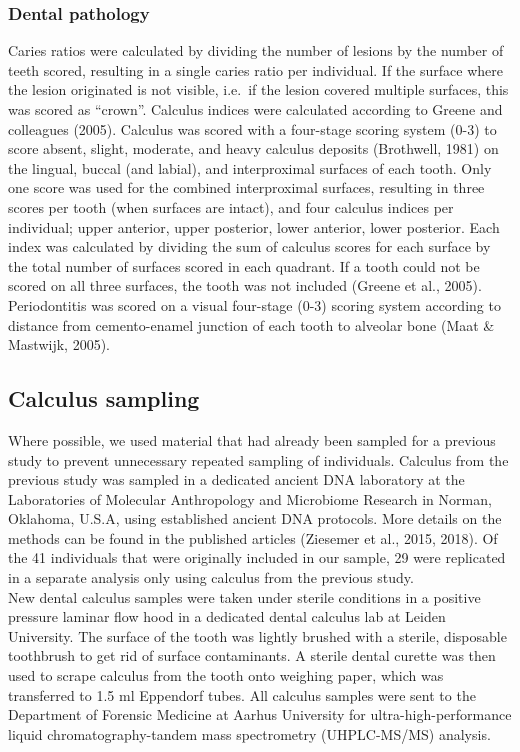 \documentclass[
]{article}
\begin{document}
\hypertarget{dental-pathology}{%
\subsubsection{Dental pathology}\label{dental-pathology}}

Caries ratios were calculated by dividing the number of lesions by the
number of teeth scored, resulting in a single caries ratio per
individual. If the surface where the lesion originated is not visible,
i.e.~if the lesion covered multiple surfaces, this was scored as
``crown''. Calculus indices were calculated according to Greene and
colleagues (2005). Calculus was scored with a four-stage scoring system
(0-3) to score absent, slight, moderate, and heavy calculus deposits
(Brothwell, 1981) on the lingual, buccal (and labial), and interproximal
surfaces of each tooth. Only one score was used for the combined
interproximal surfaces, resulting in three scores per tooth (when
surfaces are intact), and four calculus indices per individual; upper
anterior, upper posterior, lower anterior, lower posterior. Each index
was calculated by dividing the sum of calculus scores for each surface
by the total number of surfaces scored in each quadrant. If a tooth
could not be scored on all three surfaces, the tooth was not included
(Greene et al., 2005). Periodontitis was scored on a visual four-stage
(0-3) scoring system according to distance from cemento-enamel junction
of each tooth to alveolar bone (Maat \& Mastwijk, 2005).

\hypertarget{calculus-sampling}{%
\subsection{Calculus sampling}\label{calculus-sampling}}

Where possible, we used material that had already been sampled for a
previous study to prevent unnecessary repeated sampling of individuals.
Calculus from the previous study was sampled in a dedicated ancient DNA
laboratory at the Laboratories of Molecular Anthropology and Microbiome
Research in Norman, Oklahoma, U.S.A, using established ancient DNA
protocols. More details on the methods can be found in the published
articles (Ziesemer et al., 2015, 2018). Of the 41 individuals that were
originally included in our sample, 29 were replicated in a separate
analysis only using calculus from the previous study.\\
New dental calculus samples were taken under sterile conditions in a
positive pressure laminar flow hood in a dedicated dental calculus lab
at Leiden University. The surface of the tooth was lightly brushed with
a sterile, disposable toothbrush to get rid of surface contaminants. A
sterile dental curette was then used to scrape calculus from the tooth
onto weighing paper, which was transferred to 1.5 ml Eppendorf tubes.
All calculus samples were sent to the Department of Forensic Medicine at
Aarhus University for ultra-high-performance liquid
chromatography-tandem mass spectrometry (UHPLC-MS/MS) analysis.
\end{document}
